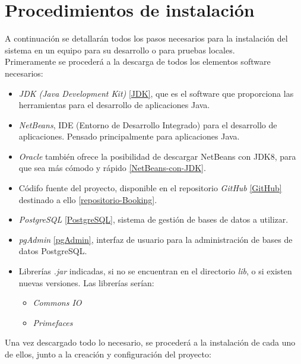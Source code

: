 \section{Procedimientos de instalación}

A continuación se detallarán todos los pasos necesarios para la instalación del sistema en un equipo para su desarrollo o para pruebas locales. \\

Primeramente se procederá a la descarga de todos los elementos software necesarios: 

\begin{itemize}
\item \textit{JDK (Java Development Kit)} \ref{JDK}, que es el software que proporciona las herramientas para el desarrollo de aplicaciones Java.
\item \textit{NetBeans}, IDE (Entorno de Desarrollo Integrado) para el desarrollo de aplicaciones. Pensado principalmente para aplicaciones Java.
\item \textit{Oracle} también ofrece la posibilidad de descargar NetBeans con JDK8, para que sea más cómodo y rápido \ref{NetBeans-con-JDK}.
\item Códifo fuente del proyecto, disponible en el repositorio \textit{GitHub} \ref{GitHub} destinado a ello \ref{repositorio-Booking}.
\item \textit{PostgreSQL} \ref{PostgreSQL}, sistema de gestión de bases de datos a utilizar.
\item \textit{pgAdmin} \ref{pgAdmin}, interfaz de usuario para la administración de bases de datos PostgreSQL.
\item Librerías \textit{.jar} indicadas, si no se encuentran en el directorio \textit{lib}, o si existen nuevas versiones. Las librerías serían:

\begin{itemize}
\item \textit{Commons IO}
\item \textit{Primefaces}
\end{itemize}
\end{itemize}

Una vez descargado todo lo necesario, se procederá a la instalación de cada uno de ellos, junto a la creación y configuración del proyecto:

